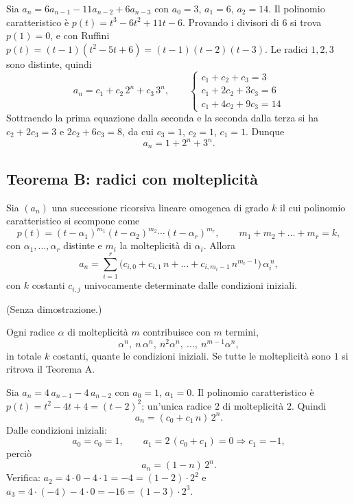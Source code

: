 \documentclass[11pt,a4paper]{article}
\begin{document}
\begin{esempio}[grado 3]
Sia $a_n = 6 a_{n-1} - 11 a_{n-2} + 6 a_{n-3}$ con $a_0 = 3$, $a_1 = 6$,
$a_2 = 14$. Il polinomio caratteristico è
$p(t) = t^3 - 6t^2 + 11t - 6$. Provando i divisori di $6$ si trova
$p(1) = 0$, e con Ruffini $p(t) = (t - 1)(t^2 - 5t + 6) = (t-1)(t-2)(t-3)$.
Le radici $1, 2, 3$ sono distinte, quindi
\[
  a_n = c_1 + c_2\, 2^n + c_3\, 3^n ,
  \qquad
  \begin{cases}
    c_1 + c_2 + c_3 = 3 \\
    c_1 + 2c_2 + 3c_3 = 6 \\
    c_1 + 4c_2 + 9c_3 = 14
  \end{cases}
\]
Sottraendo la prima equazione dalla seconda e la seconda dalla terza si ha
$c_2 + 2c_3 = 3$ e $2c_2 + 6c_3 = 8$, da cui $c_3 = 1$, $c_2 = 1$, $c_1 = 1$.
Dunque
\[
  a_n = 1 + 2^n + 3^n .
\]
\end{esempio}

\subsection{Teorema B: radici con molteplicità}

\begin{teorema}[B]
Sia $(a_n)$ una successione ricorsiva lineare omogenea di grado $k$ il cui
polinomio caratteristico si scompone come
\[
  p(t) = (t - \alpha_1)^{m_1} (t - \alpha_2)^{m_2} \cdots (t - \alpha_r)^{m_r},
  \qquad m_1 + m_2 + \dots + m_r = k ,
\]
con $\alpha_1, \dots, \alpha_r$ distinte e $m_i$ la molteplicità di
$\alpha_i$. Allora
\[
  a_n = \sum_{i=1}^{r}
        \bigl(c_{i,0} + c_{i,1}\, n + \dots + c_{i,m_i - 1}\, n^{m_i - 1}\bigr)\,
        \alpha_i^{\,n} ,
\]
con $k$ costanti $c_{i,j}$ univocamente determinate dalle condizioni iniziali.
\end{teorema}

(Senza dimostrazione.)

\begin{osservazione}
Ogni radice $\alpha$ di molteplicità $m$ contribuisce con $m$ termini,
\[
  \alpha^n,\ n\,\alpha^n,\ n^2\alpha^n,\ \dots,\ n^{m-1}\alpha^n ,
\]
in totale $k$ costanti, quante le condizioni iniziali. Se tutte le molteplicità
sono $1$ si ritrova il Teorema A.
\end{osservazione}

\begin{esempio}
Sia $a_n = 4\, a_{n-1} - 4\, a_{n-2}$ con $a_0 = 1$, $a_1 = 0$. Il polinomio
caratteristico è $p(t) = t^2 - 4t + 4 = (t - 2)^2$: un'unica radice $2$ di
molteplicità $2$. Quindi
\[
  a_n = (c_0 + c_1\, n)\, 2^n .
\]
Dalle condizioni iniziali:
\[
  a_0 = c_0 = 1 , \qquad a_1 = 2\,(c_0 + c_1) = 0 \Rightarrow c_1 = -1 ,
\]
perciò
\[
  a_n = (1 - n)\, 2^n .
\]
Verifica: $a_2 = 4 \cdot 0 - 4 \cdot 1 = -4 = (1-2)\cdot 2^2$ e
$a_3 = 4\cdot(-4) - 4 \cdot 0 = -16 = (1-3)\cdot 2^3$.
\end{esempio}
\end{document}
